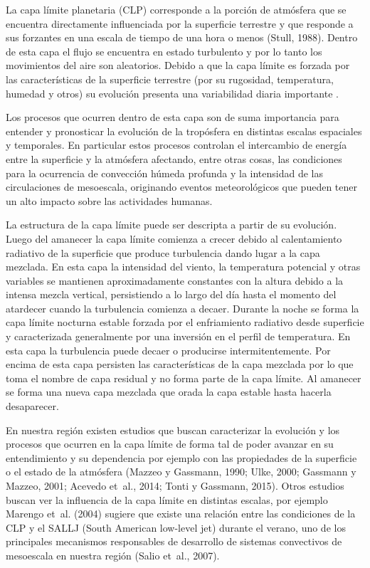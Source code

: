\documentclass[12pt,spanish,oneside, a4paper]{book}
\begin{document}
La capa límite planetaria (CLP) corresponde a la porción de atmósfera
que se encuentra directamente influenciada por la superficie terrestre y
que responde a sus forzantes en una escala de tiempo de una hora o menos
(Stull, 1988). Dentro de esta capa el flujo se encuentra en estado
turbulento y por lo tanto los movimientos del aire son aleatorios.
Debido a que la capa límite es forzada por las características de la
superficie terrestre (por su rugosidad, temperatura, humedad y otros) su
evolución presenta una variabilidad diaria importante .

Los procesos que ocurren dentro de esta capa son de suma importancia
para entender y pronosticar la evolución de la tropósfera en distintas
escalas espaciales y temporales. En particular estos procesos controlan
el intercambio de energía entre la superficie y la atmósfera afectando,
entre otras cosas, las condiciones para la ocurrencia de convección
húmeda profunda y la intensidad de las circulaciones de mesoescala,
originando eventos meteorológicos que pueden tener un alto impacto sobre
las actividades humanas.

La estructura de la capa límite puede ser descripta a partir de su
evolución. Luego del amanecer la capa límite comienza a crecer debido al
calentamiento radiativo de la superficie que produce turbulencia dando
lugar a la capa mezclada. En esta capa la intensidad del viento, la
temperatura potencial y otras variables se mantienen aproximadamente
constantes con la altura debido a la intensa mezcla vertical,
persistiendo a lo largo del día hasta el momento del atardecer cuando la
turbulencia comienza a decaer. Durante la noche se forma la capa límite
nocturna estable forzada por el enfriamiento radiativo desde superficie
y caracterizada generalmente por una inversión en el perfil de
temperatura. En esta capa la turbulencia puede decaer o producirse
intermitentemente. Por encima de esta capa persisten las características
de la capa mezclada por lo que toma el nombre de capa residual y no
forma parte de la capa límite. Al amanecer se forma una nueva capa
mezclada que orada la capa estable hasta hacerla desaparecer.

En nuestra región existen estudios que buscan caracterizar la evolución
y los procesos que ocurren en la capa límite de forma tal de poder
avanzar en su entendimiento y su dependencia por ejemplo con las
propiedades de la superficie o el estado de la atmósfera (Mazzeo y
Gassmann, 1990; Ulke, 2000; Gassmann y Mazzeo, 2001; Acevedo et~al.,
2014; Tonti y Gassmann, 2015). Otros estudios buscan ver la influencia
de la capa límite en distintas escalas, por ejemplo Marengo et~al.
(2004) sugiere que existe una relación entre las condiciones de la CLP y
el SALLJ (South American low-level jet) durante el verano, uno de los
principales mecanismos responsables de desarrollo de sistemas
convectivos de mesoescala en nuestra región (Salio et~al., 2007).
\end{document}
